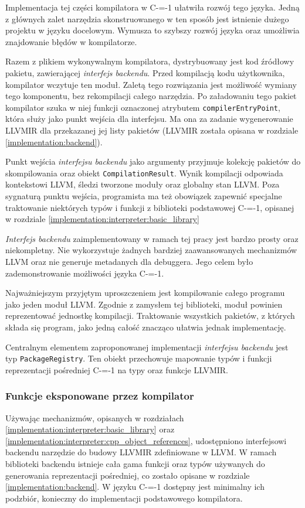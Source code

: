 Implementacja tej części kompilatora w C-=-1 ułatwiła rozwój tego języka.
Jedną z głównych zalet narzędzia skonstruowanego w ten sposób jest istnienie dużego projektu w języku docelowym.
Wymusza to szybszy rozwój języka oraz umożliwia znajdowanie błędów w kompilatorze.

Razem z plikiem wykonywalnym kompilatora, dystrybuowany jest kod źródłowy pakietu, zawierającej \emph{interfejs backendu}. 
Przed kompilacją kodu użytkownika, kompilator wczytuje ten moduł.
Zaletą tego rozwiązania jest możliwość wymiany tego komponentu, bez rekompilacji całego narzędzia.
Po załadowaniu tego pakiet kompilator szuka w niej funkcji oznaczonej atrybutem \lstinline{compilerEntryPoint}, która służy jako punkt wejścia dla interfejsu. 
Ma ona za zadanie wygenerowanie LLVMIR dla przekazanej jej listy pakietów (LLVMIR została opisana w rozdziale \ref{implementation:backend}).

Punkt wejścia \emph{interfejsu backendu} jako argumenty przyjmuje kolekcję pakietów do skompilowania oraz obiekt \lstinline{CompilationResult}.
Wynik kompilacji odpowiada kontekstowi LLVM, śledzi tworzone moduły oraz globalny stan LLVM.
Poza sygnaturą punktu wejścia, programista ma też obowiązek zapewnić specjalne traktowanie niektórych typów i funkcji z biblioteki podstawowej C-=-1, opisanej w rozdziale \ref{implementation:interpreter:basic_library}

\emph{Interfejs backendu} zaimplementowany w ramach tej pracy jest bardzo prosty oraz niekompletny.
Nie wykorzystuje żadnych bardziej zaawansowanych mechanizmów LLVM oraz nie generuje metadanych dla debuggera.
Jego celem było zademonstrowanie możliwości języka C-=-1.

Najważniejszym przyjętym uproszczeniem jest kompilowanie całego programu jako jeden moduł LLVM.
Zgodnie z zamysłem tej biblioteki, moduł powinien reprezentować jednostkę kompilacji.
Traktowanie wszystkich pakietów, z których składa się program, jako jedną całość znacząco ułatwia jednak implementację.

Centralnym elementem zaproponowanej implementacji \emph{interfejsu backendu} jest typ \lstinline{PackageRegistry}.
Ten obiekt przechowuje mapowanie typów i funkcji reprezentacji pośredniej C-=-1 na typy oraz funkcje LLVMIR.
\subsubsection{Funkcje eksponowane przez kompilator}

Używając mechanizmów, opisanych w rozdziałach \ref{implementation:interpreter:basic_library} oraz \ref{implementation:interpreter:cpp_object_references}, udostępniono interfejsowi backendu narzędzie do budowy LLVMIR zdefiniowane w LLVM.
W ramach biblioteki backendu istnieje cała gama funkcji oraz typów używanych do generowania reprezentacji pośredniej, co zostało opisane w rozdziale \ref{implementation:backend}.
W języku C-=-1 dostępny jest minimalny ich podzbiór, konieczny do implementacji podstawowego kompilatora.

